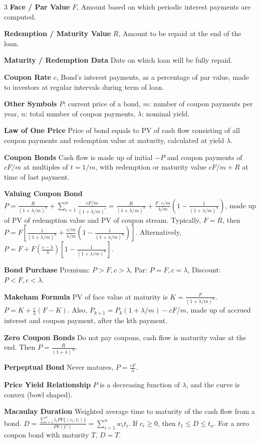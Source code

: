 \documentclass[10pt, landscape]{article}
\begin{document}
\begin{multicols*}{3}
\textbf{Face / Par Value} $F$, Amount based on which periodic interest payments are computed.

\textbf{Redemption / Maturity Value} $R$, Amount to be repaid at the end of the loan.

\textbf{Maturity / Redemption Data} Date on which loan will be fully repaid.

\textbf{Coupon Rate} $c$, Bond's interest payments, as a percentage of par value, made to investors at regular intervals during term of loan.

\textbf{Other Symbols} $P$: current price of a bond, $m$: number of coupon payments per year, $n$: total number of coupon payments, $\lambda$: nominal yield.

\textbf{Law of One Price} Price of bond equals to PV of cash flow consisting of all coupon payments and redemption value at maturity, calculated at yield $\lambda$.

\textbf{Coupon Bonds} Cash flow is made up of initial $-P$ and coupon payments of $cF/m$ at multiples of $t=1/m$, with redemption or maturity value $cF/m + R$ at time of last payment.

\textbf{Valuing Coupon Bond} $P=\frac{R}{(1+\lambda/m)^n}+\sum_{i=1}^n\frac{cF/m}{(1+\lambda/m)^i}=\frac{R}{(1+\lambda/m)^n}+\frac{F\cdot c/m}{\lambda/m}(1-\frac{1}{(1+\lambda/m)^n})$, made up of PV of redemption value and PV of coupon stream. Typically, $F=R$, then $P=F[\frac{1}{(1+\lambda/m)^n}+\frac{c/m}{\lambda/m}(1-\frac{1}{(1+\lambda/m)^n})]$. Alternatively, $P=F+F(\frac{c-\lambda}{\lambda})[1-\frac{1}{(1+\lambda/m)^n}]$.

\textbf{Bond Purchase} Premium: $P>F, c > \lambda$, Par: $P=F, c=\lambda$, Discount: $P<F, c < \lambda$.

\textbf{Makeham Formula} PV of face value at maturity is $K=\frac{F}{(1+\lambda/m)^n}$. $P=K+\frac{c}{\lambda}(F-K)$. Also, $P_{k+1}=P_k(1+\lambda/m)-cF/m$, made up of accrued interest and coupon payment, after the kth payment.

\textbf{Zero Coupon Bonds} Do not pay coupons, cash flow is maturity value at the end. Then $P=\frac{R}{(1+\lambda)^N}$.

\textbf{Perpeptual Bond} Never matures, $P=\frac{cF}{\lambda}$.

\textbf{Price Yield Relationship} $P$ is a decreasing function of $\lambda$, and the curve is convex (bowl shaped).

\textbf{Macaulay Duration} Weighted average time to maturity of the cash flow from a bond. $D=\frac{\sum_{i=1}^nt_iPV\{(c_i, t_i)\}}{PV(C)}=\sum_{i=1}^nw_it_i$. If $c_i \geq 0$, then $t_1\leq D \leq t_n$. For a zero coupon bond with maturity $T$, $D=T$.


\end{multicols*}
\end{document}
